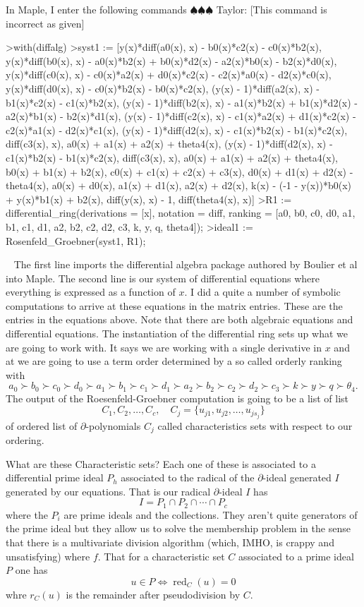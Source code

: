\documentclass[12pt]{book}
\newcommand{\taylor}[1]{{\color{blue} \sf $\spadesuit\spadesuit\spadesuit$ Taylor: [#1]}}
\numberwithin{equation}{section}
\theoremstyle{definition}
\theoremstyle{remark}
\newcommand{\red}{\operatorname{red}}
\begin{document}
\noindent In \textsf{Maple}, I enter the following commands
\taylor{This command is incorrect as given}
\begin{spverbatim}
	>with(diffalg)
	>syst1 := [y(x)*diff(a0(x), x) - b0(x)*c2(x) - c0(x)*b2(x), y(x)*diff(b0(x), x) - a0(x)*b2(x) + b0(x)*d2(x) - a2(x)*b0(x) - b2(x)*d0(x), y(x)*diff(c0(x), x) - c0(x)*a2(x) + d0(x)*c2(x) - c2(x)*a0(x) - d2(x)*c0(x), y(x)*diff(d0(x), x) - c0(x)*b2(x) - b0(x)*c2(x), (y(x) - 1)*diff(a2(x), x) - b1(x)*c2(x) - c1(x)*b2(x), (y(x) - 1)*diff(b2(x), x) - a1(x)*b2(x) + b1(x)*d2(x) - a2(x)*b1(x) - b2(x)*d1(x), (y(x) - 1)*diff(c2(x), x) - c1(x)*a2(x) + d1(x)*c2(x) - c2(x)*a1(x) - d2(x)*c1(x), (y(x) - 1)*diff(d2(x), x) - c1(x)*b2(x) - b1(x)*c2(x), diff(c3(x), x), a0(x) + a1(x) + a2(x) + theta4(x), (y(x) - 1)*diff(d2(x), x) - c1(x)*b2(x) - b1(x)*c2(x), diff(c3(x), x), a0(x) + a1(x) + a2(x) + theta4(x), b0(x) + b1(x) + b2(x), c0(x) + c1(x) + c2(x) + c3(x), d0(x) + d1(x) + d2(x) - theta4(x), a0(x) + d0(x), a1(x) + d1(x), a2(x) + d2(x), k(x) - (-1 - y(x))*b0(x) + y(x)*b1(x) + b2(x), diff(y(x), x) - 1, diff(theta4(x), x)]
	>R1 := differential_ring(derivations = [x], notation = diff, ranking = [a0, b0, c0, d0, a1, b1, c1, d1, a2, b2, c2, d2, c3, k, y, q, theta4]);
	>ideal1 := Rosenfeld_Groebner(syst1, R1);
\end{spverbatim}
\ \newline
The first line imports the differential algebra package authored by Boulier et al into \textsf{Maple}. 
The second line is our system of differential equations where everything is expressed as a function of $x$. 
I did a quite a number of symbolic computations to arrive at these equations in the matrix entries. 
These are the entries in the equations above. 
Note that there are both algebraic equations and differential equations. 
The instantiation of the differential ring sets up what we are going to work with. 
It says we are working with a single derivative in $x$ and at we are going to use a term order determined by a so called orderly ranking with 
$$a_0\succ b_0 \succ c_0 \succ d_0 \succ a_1 \succ b_1 \succ c_1 \succ d_1 \succ a_2\succ b_2 \succ c_2 \succ d_2 \succ c_3 \succ  k \succ  y \succ q \succ  \theta_4.$$
The output of the Roesenfeld-Groebner computation is going to be a list of list
$$ C_1, C_2,\ldots, C_c, \quad C_j = \lbrace u_{j1}, u_{j2},\ldots, u_{js_j} \rbrace $$
of ordered list of $\partial$-polynomials $C_j$ called characteristics sets with respect to our ordering.

What are these Characteristic sets? 
Each one of these is associated to a differential prime ideal $P_h$ associated to the radical of the $\partial$-ideal generated $I$ generated by our equations.
That is our radical $\partial$-ideal $I$ has 
$$ I = P_1 \cap P_2 \cap \cdots \cap P_c $$
where the $P_i$ are prime ideals and the collections.
They aren't quite generators of the prime ideal but they allow us to solve the membership problem in the sense that there is a multivariate division algorithm (which, IMHO, is crappy and unsatisfying) where $f$. 
That for a characteristic set $C$ associated to a prime ideal $P$ one has 
$$ u\in P \iff \red_C(u) =0 $$
whre $r_C(u)$ is the remainder after pseudodivision by $C$.
\end{document}
